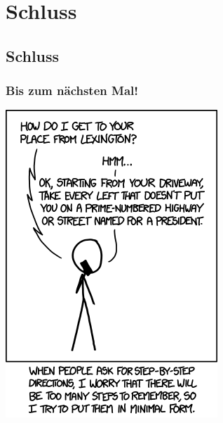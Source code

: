 \section{Schluss}
\subsection{Schluss}
\begin{frame}
\frametitle{Bis zum nächsten Mal!}
\begin{center}
	\includegraphics[height=0.85\textheight]{images/kolmogorov_directions.png}
\end{center}
\end{frame}

